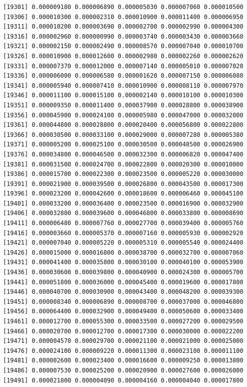 \documentclass[]{article}
\begin{document}
\begin{verbatim}
[19301] 0.000009180 0.000006890 0.000005030 0.000007060 0.000010500
[19306] 0.000010300 0.000002310 0.000010900 0.000011400 0.000006950
[19311] 0.000010200 0.000003690 0.000002700 0.000002990 0.000004300
[19316] 0.000002960 0.000000990 0.000003740 0.000003430 0.000003660
[19321] 0.000002150 0.000002490 0.000008570 0.000007040 0.000010700
[19326] 0.000010900 0.000012600 0.000002980 0.000002260 0.000002620
[19331] 0.000007370 0.000012000 0.000007140 0.000005010 0.000007020
[19336] 0.000006000 0.000006580 0.000001620 0.000007150 0.000006080
[19341] 0.000005940 0.000007410 0.000010900 0.000008110 0.000007970
[19346] 0.000011100 0.000015100 0.000002140 0.000010100 0.000010300
[19351] 0.000009350 0.000011400 0.000037900 0.000028800 0.000038900
[19356] 0.000045900 0.000024100 0.000005980 0.000047000 0.000032000
[19361] 0.000044800 0.000028800 0.000020400 0.000056800 0.000022800
[19366] 0.000030500 0.000033100 0.000029000 0.000007280 0.000005380
[19371] 0.000005200 0.000025100 0.000030500 0.000048500 0.000026900
[19376] 0.000034800 0.000046500 0.000032300 0.000006820 0.000047400
[19381] 0.000031500 0.000024700 0.000022800 0.000020300 0.000010000
[19386] 0.000015700 0.000022300 0.000023500 0.000005220 0.000030000
[19391] 0.000021900 0.000039500 0.000026800 0.000043500 0.000017300
[19396] 0.000023200 0.000042600 0.000018600 0.000006460 0.000045100
[19401] 0.000033200 0.000036400 0.000023500 0.000016900 0.000032900
[19406] 0.000032800 0.000039600 0.000046800 0.000033800 0.000008690
[19411] 0.000006480 0.000007760 0.000027700 0.000039400 0.000005760
[19416] 0.000003660 0.000005370 0.000007160 0.000005930 0.000002920
[19421] 0.000007040 0.000005220 0.000005310 0.000005540 0.000024400
[19426] 0.000015000 0.000016800 0.000038700 0.000032700 0.000007060
[19431] 0.000041400 0.000035800 0.000030100 0.000040100 0.000053900
[19436] 0.000030600 0.000039800 0.000040900 0.000024300 0.000005700
[19441] 0.000051800 0.000036000 0.000045400 0.000019600 0.000017800
[19446] 0.000040700 0.000030900 0.000043400 0.000048200 0.000039300
[19451] 0.000008340 0.000006890 0.000008700 0.000037000 0.000046800
[19456] 0.000064400 0.000032900 0.000049400 0.000050600 0.000033400
[19461] 0.000012700 0.000055300 0.000033500 0.000027200 0.000029500
[19466] 0.000020700 0.000012700 0.000017300 0.000030000 0.000022200
[19471] 0.000004570 0.000029700 0.000021100 0.000021000 0.000025000
[19476] 0.000024100 0.000009220 0.000011300 0.000023100 0.000011100
[19481] 0.000002600 0.000023400 0.000016600 0.000009250 0.000013800
[19486] 0.000007530 0.000025200 0.000020900 0.000027600 0.000026000
[19491] 0.000021800 0.000004090 0.000004160 0.000004040 0.000017800

\end{verbatim}
\end{document}
